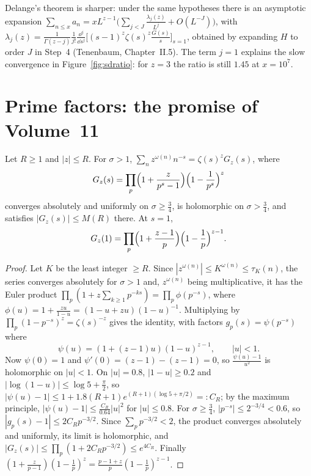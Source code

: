 \begin{remark}
Delange's theorem is sharper: under the same hypotheses there is an asymptotic expansion $\sum_{n\le x}a_n=xL^{z-1}\bigl(\sum_{j<J}\frac{\lambda_j(z)}{L^j}+O(L^{-J})\bigr)$, with $\lambda_j(z)=\frac1{\Gamma(z-j)}\frac1{j!}\frac{\dd^j}{\dd s^j}\bigl[(s-1)^z\zeta(s)^z\frac{G(s)}s\bigr]_{s=1}$, obtained by expanding $H$ to order $J$ in Step~4 (Tenenbaum, Chapter~II.5). The term $j=1$ explains the slow convergence in Figure~\ref{fig:sdratio}: for $z=3$ the ratio is still $1.45$ at $x=10^7$.
\end{remark}

\section{Prime factors: the promise of Volume~11}

\begin{lemma}\label{lem:eulerprod}
Let $R\ge1$ and $|z|\le R$. For $\sigma>1$, $\sum_nz^{\omega(n)}n^{-s}=\zeta(s)^zG_z(s)$, where
\[
G_z(s)=\prod_p\Bigl(1+\frac z{p^s-1}\Bigr)\Bigl(1-\frac1{p^s}\Bigr)^z
\]
converges absolutely and uniformly on $\sigma\ge\frac34$, is holomorphic on $\sigma>\frac34$, and satisfies $|G_z(s)|\le M(R)$ there. At $s=1$,
\[
G_z(1)=\prod_p\Bigl(1+\frac{z-1}p\Bigr)\Bigl(1-\frac1p\Bigr)^{z-1}.
\]
\end{lemma}
\begin{proof}
Let $K$ be the least integer $\ge R$. Since $|z^{\omega(n)}|\le K^{\omega(n)}\le\tau_K(n)$, the series converges absolutely for $\sigma>1$ and, $z^{\omega(n)}$ being multiplicative, it has the Euler product $\prod_p(1+z\sum_{k\ge1}p^{-ks})=\prod_p\phi(p^{-s})$, where $\phi(u)=1+\frac{zu}{1-u}=(1-u+zu)(1-u)^{-1}$. Multiplying by $\prod_p(1-p^{-s})^z=\zeta(s)^{-z}$ gives the identity, with factors $g_p(s)=\psi(p^{-s})$ where
\[
\psi(u)=(1+(z-1)u)(1-u)^{z-1},\qquad|u|<1.
\]
Now $\psi(0)=1$ and $\psi'(0)=(z-1)-(z-1)=0$, so $\frac{\psi(u)-1}{u^2}$ is holomorphic on $|u|<1$. On $|u|=0.8$, $|1-u|\ge0.2$ and $|\log(1-u)|\le\log5+\frac\pi2$, so $|\psi(u)-1|\le1+1.8(R+1)e^{(R+1)(\log5+\pi/2)}=:C_R$; by the maximum principle, $|\psi(u)-1|\le\frac{C_R}{0.64}|u|^2$ for $|u|\le0.8$. For $\sigma\ge\frac34$, $|p^{-s}|\le2^{-3/4}<0.6$, so $|g_p(s)-1|\le2C_Rp^{-3/2}$. Since $\sum_pp^{-3/2}<2$, the product converges absolutely and uniformly, its limit is holomorphic, and $|G_z(s)|\le\prod_p(1+2C_Rp^{-3/2})\le e^{4C_R}$. Finally $(1+\frac z{p-1})(1-\frac1p)^z=\frac{p-1+z}p(1-\frac1p)^{z-1}$.
\end{proof}

